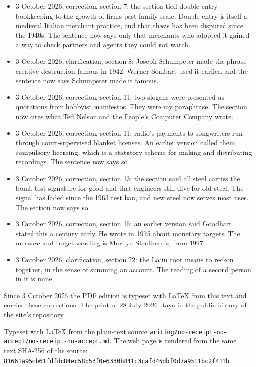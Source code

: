 \documentclass[11pt]{article}
\begin{document}
\begin{itemize}
\item 3 October 2026, correction, section 7: the section tied double-entry bookkeeping to the growth of firms past family scale. Double-entry is itself a medieval Italian merchant practice, and that thesis has been disputed since the 1940s. The sentence now says only that merchants who adopted it gained a way to check partners and agents they could not watch.
\item 3 October 2026, clarification, section 8: Joseph Schumpeter made the phrase creative destruction famous in 1942. Werner Sombart used it earlier, and the sentence now says Schumpeter made it famous.
\item 3 October 2026, correction, section 11: two slogans were presented as quotations from hobbyist manifestos. They were my paraphrase. The section now cites what Ted Nelson and the People's Computer Company wrote.
\item 3 October 2026, correction, section 11: radio's payments to songwriters run through court-supervised blanket licenses. An earlier version called them compulsory licensing, which is a statutory scheme for making and distributing recordings. The sentence now says so.
\item 3 October 2026, correction, section 13: the section said all steel carries the bomb-test signature for good and that engineers still dive for old steel. The signal has faded since the 1963 test ban, and new steel now serves most uses. The section now says so.
\item 3 October 2026, correction, section 15: an earlier version said Goodhart stated this a century early. He wrote in 1975 about monetary targets. The measure-and-target wording is Marilyn Strathern's, from 1997.
\item 3 October 2026, clarification, section 22: the Latin root means to reckon together, in the sense of summing an account. The reading of a second person in it is mine.
\end{itemize}

Since 3 October 2026 the PDF edition is typeset with LaTeX from this text and carries these corrections. The print of 28 July 2026 stays in the public history of the site's repository.

\vfill{\footnotesize Typeset with LaTeX from the plain-text source \texttt{writing/no-receipt-no-accept/no-receipt-no-accept.md}. The web page is rendered from the same text.\newline SHA-256 of the source: \texttt{81661a95cb61fdfdc84ec58b53f0e6330b841c3cafd46dbf0d7a9511bc2f411b}\par}
\end{document}
